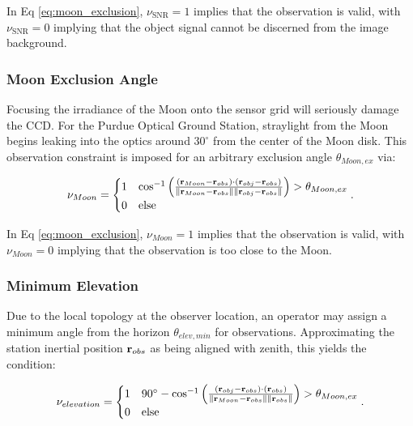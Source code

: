 In Eq \ref{eq:moon_exclusion}, $\nu_{\mathrm{SNR}} = 1$ implies that the observation is valid, with $\nu_{\mathrm{SNR}} = 0$ implying that the object signal cannot be discerned from the image background.

\subsubsection{Moon Exclusion Angle}

Focusing the irradiance of the Moon onto the sensor grid will seriously damage the CCD. For the Purdue Optical Ground Station, straylight from the Moon begins leaking into the optics around $30^\circ$ from the center of the Moon disk. This observation constraint is imposed for an arbitrary exclusion angle $\theta_{Moon,ex}$ via:

\begin{equation} \label{eq:moon_exclusion}
  \nu_{Moon} = \begin{cases}
    1 & \cos^{-1}\left( \frac{\left( \mathbf{r}_{Moon} - \mathbf{r}_{obs} \right) \cdot \left( \mathbf{r}_{obj} - \mathbf{r}_{obs} \right)}{\| \mathbf{r}_{Moon} - \mathbf{r}_{obs} \| \| \mathbf{r}_{obj} - \mathbf{r}_{obs} \|} \right) > \theta_{Moon,ex}\\
    0 & \mathrm{else}
  \end{cases}.
\end{equation}

In Eq \ref{eq:moon_exclusion}, $\nu_{Moon} = 1$ implies that the observation is valid, with $\nu_{Moon} = 0$ implying that the observation is too close to the Moon.

\subsubsection{Minimum Elevation}

Due to the local topology at the observer location, an operator may assign a minimum angle from the horizon $\theta_{elev,min}$ for observations. Approximating the station inertial position $\mathbf{r}_{obs}$ as being aligned with zenith, this yields the condition:


\begin{equation} \label{eq:elevation_exclusion}
  \nu_{elevation} = \begin{cases}
    1 & 90^\circ - \cos^{-1}\left( \frac{\left( \mathbf{r}_{obj} - \mathbf{r}_{obs} \right) \cdot \left( \mathbf{r}_{obs} \right)}{\| \mathbf{r}_{Moon} - \mathbf{r}_{obs} \| \| \mathbf{r}_{obs} \|} \right) > \theta_{Moon,ex}\\
    0 & \mathrm{else}
  \end{cases}.
\end{equation}

